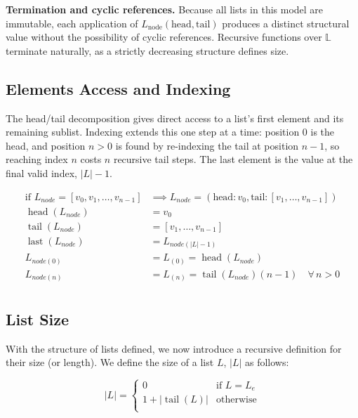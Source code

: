 \textbf{Termination and cyclic references.} Because all lists in this
model are immutable, each application of $L_{\text{node}}(\text{head},
\text{tail})$ produces a distinct structural value without the
possibility of cyclic references. Recursive functions over $\mathbb{L}$
terminate naturally, as a strictly decreasing structure defines size.

\subsection{Elements Access and Indexing}

The head/tail decomposition gives direct access to a list's first element
and its remaining sublist. Indexing extends this one step at a time:
position $0$ is the head, and position $n > 0$ is found by re-indexing
the tail at position $n - 1$, so reaching index $n$ costs $n$ recursive
tail steps. The last element is the value at the final valid index,
$|L| - 1$.

\begin{equation*}
\begin{aligned}
\text{if } L_{node} = [v_0, v_1, \dots, v_{n-1} ] & \implies L_{node} = (\text{head}: v_0, \text{tail}: [v_1, \dots, v_{n-1}]) \\
\operatorname{head}(L_{node}) & = v_0 \\
\operatorname{tail}(L_{node}) & = [v_1, \dots, v_{n-1}] \\
\operatorname{last}(L_{node}) & = L_{node(|L| - 1)} \\
L_{node(0)} & = L_{(0)} = \operatorname{head}(L_{node}) \\
L_{node(n)} & = L_{(n)} = \operatorname{tail}(L_{node})(n - 1) \quad \forall\, n > 0 \\
\end{aligned}
\end{equation*}

\subsection{List Size}

With the structure of lists defined, we now introduce a recursive
definition for their size (or length). We define the size of a list $L$,
$|L|$ as follows:

\begin{equation*}
|L| = \begin{cases}
0 & \text{if } L = L_{e} \\
1 + |\operatorname{tail}(L)| & \text{otherwise} \\
\end{cases}
\end{equation*}


